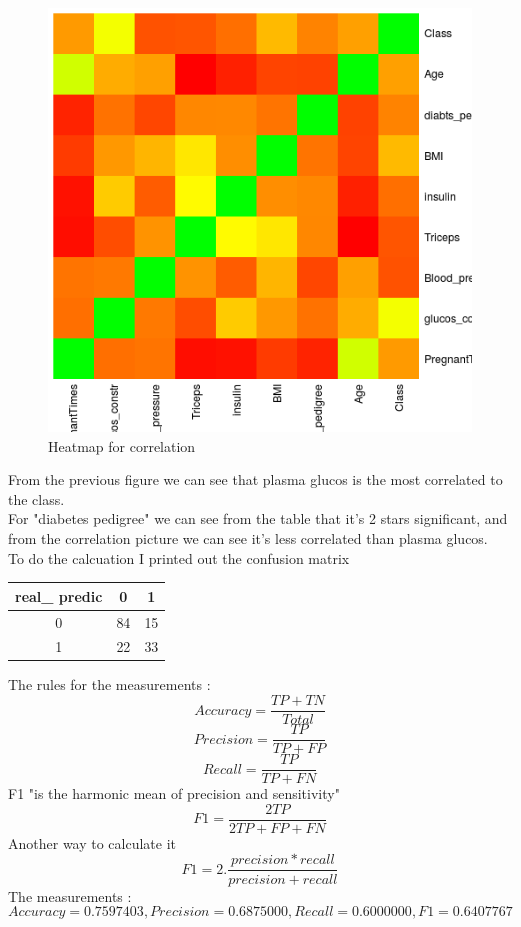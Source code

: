 \documentclass{article}
\begin{document}
\begin{figure}[H]
\includegraphics[scale=0.9]{correlationhm.png}
\caption{Heatmap for correlation}
\end{figure}
From the previous figure we can see that plasma glucos is the most correlated to the class.\\
For "diabetes pedigree" we can see from the table that it's 2 stars significant, and from the correlation picture we can see it's less correlated than plasma glucos.\\
To do the calcuation I printed out the confusion matrix \\
\begin{tabular}{|c|c|c|}
\hline
real\_ predic&0&1\\ \hline
0& 84 & 15 \\ \hline
   1 &22 &33\\ \hline
\end{tabular}
The rules for the measurements :
\[Accuracy = \frac{TP+TN}{Total} \]
\[Precision = \frac{TP}{TP+FP}\]
\[Recall = \frac{TP}{TP+FN} \]
F1 "is the harmonic mean of precision and sensitivity" \cite{1}
\[F1 =\frac{2TP}{2TP+FP+FN}\]
Another way to calculate it
\[F1 =2.\frac{precision*recall}{precision+recall}\]
The measurements :\[ Accuracy=0.7597403,Precision= 0.6875000,Recall= 0.6000000,F1= 0.6407767\]
\end{document}
